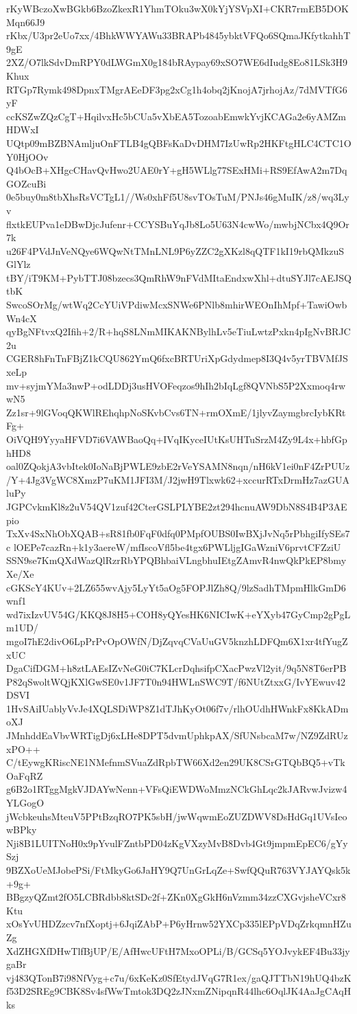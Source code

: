 rKyWBczoXwBGkb6BzoZkexR1YhmTOku3wX0kYjYSVpXI+CKR7rmEB5DOKMqn66J9
rKbx/U3pr2eUo7xx/4BhkWWYAWu33BRAPb4845ybktVFQo6SQmaJKfytkahhT9gE
2XZ/O7lkSdvDmRPY0dLWGmX0g184bRAypay69xSO7WE6dIudg8Eo81LSk3H9Khux
RTGp7Rymk498DpnxTMgrAEeDF3pg2xCg1h4obq2jKnojA7jrhojAz/7dMVTfG6yF
ccKSZwZQzCgT+HqilvxHc5bCUa5vXbEA5TozoabEmwkYvjKCAGa2e6yAMZmHDWxI
UQtp09mBZBNAmljuOnFTLB4gQBFsKaDvDHM7IzUwRp2HKFtgHLC4CTC1OY0HjOOv
Q4bOcB+XHgcCHavQvHwo2UAE0rY+gH5WLlg77SExHMi+RS9EfAwA2m7DqGOZcuBi
0e5buy0m8tbXhsRsVCTgL1//Ws0xhFf5U8svTOsTuM/PNJs46gMuIK/z8/wq3Lyv
flxtkEUPva1eDBwDjcJufenr+CCYSBuYqJb8Lo5U63N4cwWo/mwbjNCbx4Q9Or7k
u26F4PVdJnVeNQye6WQwNtTMnLNL9P6yZZC2gXKzl8qQTF1kI19rbQMkzuSGlYlz
tBY/iT9KM+PybTTJ08bzecs3QmRhW9nFVdMItaEndxwXhl+dtuSYJl7cAEJSQtbK
SwcoSOrMg/wtWq2CcYUiVPdiwMcxSNWe6PNlb8mhirWEOnIhMpf+TawiOwbWn4cX
qyBgNFtvxQ2Ifih+2/R+hqS8LNmMIKAKNBylhLv5eTiuLwtzPxkn4pIgNvBRJC2u
CGER8hFnTnFBjZ1kCQU862YmQ6fxcBRTUriXpGdydmep8I3Q4v5yrTBVMfJSxeLp
mv+syjmYMa3nwP+odLDDj3usHVOFeqzos9hIh2bIqLgf8QVNbS5P2Xxmoq4rwwN5
Zz1sr+9lGVoqQKWlREhqhpNoSKvbCvs6TN+rmOXmE/1jlyvZaymgbrcIybKRtFg+
OiVQH9YyyaHFVD7i6VAWBaoQq+IVqIKyceIUtKsUHTuSrzM4Zy9L4x+hbfGphHD8
oal0ZQokjA3vbItek0IoNaBjPWLE9zbE2rVeYSAMN8nqn/nH6kV1ei0nF4ZrPUUz
/Y+4Jg3VgWC8XmzP7uKM1JFI3M/J2jwH9Tlxwk62+xccurRTxDrmHz7azGUAluPy
JGPCvkmKl8z2uV54QV1zuf42CterGSLPLYBE2zt294hcnuAW9DbN8S4B4P3AEpio
TxXv4SxNhObXQAB+sR81fb0FqF0dfq0PMpfOUBS0IwBXjJvNq5rPbhgiIfySEs7c
lOEPe7cazRn+k1y3aereW/mfIscoVfl5be4tgx6PWLljgIGaWzniV6prvtCFZziU
SSN9se7KmQXdWazQlRzrRbYPQBhbaiVLngbhuIEtgZAmvR4nwQkPkEP8bmyXe/Xe
cGKScY4KUv+2LZ655wvAjy5LyYt5aOg5FOPJlZh8Q/9lzSadhTMpmHlkGmD6wnf1
wd7ixIzvUV54G/KKQ8J8H5+COH8yQYesHK6NICIwK+eYXyb47GyCmp2gPgLm1UD/
mgoI7hE2divO6LpPrPvOpOWfN/DjZqvqCVaUuGV5knzhLDFQm6X1xr4tfYugZxUC
DgaCifDGM+h8ztLAEsIZvNeG0iC7KLcrDqhsifpCXacPwzVl2yit/9q5N8T6erPB
P82qSwoltWQjKXlGwSE0v1JF7T0n94HWLnSWC9T/f6NUtZtxxG/IvYEwuv42DSVI
1HvSAiIUablyVvJe4XQLSDiWP8Z1dTJhKyOt06f7v/rlhOUdhHWnkFx8KkADmoXJ
JMnhddEaVbvWRTigDj6xLHe8DPT5dvmUphkpAX/SfUNsbcaM7w/NZ9ZdRUzxPO++
C/tEywgKRiscNE1NMefnmSVuaZdRpbTW66Xd2en29UK8CSrGTQbBQ5+vTkOaFqRZ
g6B2o1RTggMgkVJDAYwNenn+VFsQiEWDWoMmzNCkGhLqc2kJARvwJvizw4YLGogO
jWcbkeuhsMteuV5PPtBzqRO7PK5sbH/jwWqwmEoZUZDWV8DsHdGq1UVsIeowBPky
Nji8B1LUITNoH0x9pYvulFZntbPD04zKgVXzyMvB8Dvb4Gt9jmpmEpEC6/gYySzj
9BZXoUeMJobePSi/FtMkyGo6JaHY9Q7UnGrLqZe+SwfQQuR763VYJAYQsk5k+9g+
BBgzyQZmt2fO5LCBRdbb8ktSDc2f+ZKn0XgGkH6nVzmm34zzCXGvjsheVCxr8Ktu
xOsYvUHDZzcv7nfXoptj+6JqiZAbP+P6yHrnw52YXCp335lEPpVDqZrkqmnHZuZg
XdZHGXfDHwTlfBjUP/E/AfHwcUFtH7MxoOPLi/B/GCSq5YOJvykEF4Bu33jygaBr
vj483QTonB7i98NfVyg+c7u/6xKeKz0SfEtydJVqG7R1ex/gaQJTTbN19hUQ4bzK
f53D2SREg9CBK8Sv4sfWwTmtok3DQ2zJNxmZNipqnR44lhc6OqlJK4AaJgCAqHks
